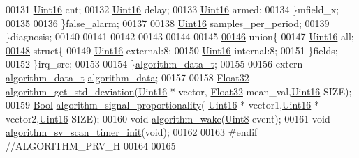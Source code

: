 \begin{DoxyCode}
00131                 \hyperlink{a00072_a59a9f6be4562c327cbfb4f7e8e18f08b}{Uint16}                 cnt;
00132                 \hyperlink{a00072_a59a9f6be4562c327cbfb4f7e8e18f08b}{Uint16}                 delay;
00133                 \hyperlink{a00072_a59a9f6be4562c327cbfb4f7e8e18f08b}{Uint16}                 armed;
00134             \}mfield\_x;
00135 
00136     \}false\_alarm;
00137 
00138       \hyperlink{a00072_a59a9f6be4562c327cbfb4f7e8e18f08b}{Uint16}  samples\_per\_period;
00139     \}diagnosis;
00140    
00141 
00142 
00143 
00144     
00145 
\hypertarget{a00016_source_l00146}{}\hyperlink{a00016}{00146}     \textcolor{keyword}{union}\{
00147         \hyperlink{a00072_a59a9f6be4562c327cbfb4f7e8e18f08b}{Uint16} all;
\hypertarget{a00016_source_l00148}{}\hyperlink{a00016}{00148}         \textcolor{keyword}{struct}\{
00149             \hyperlink{a00072_a59a9f6be4562c327cbfb4f7e8e18f08b}{Uint16} external:8;
00150             \hyperlink{a00072_a59a9f6be4562c327cbfb4f7e8e18f08b}{Uint16} \textcolor{keyword}{internal}:8;
00151         \}fields;
00152     \}irq\_src;
00153    
00154 \}\hyperlink{a00016_d1/d84/a00097}{algorithm\_data\_t};
00155 
00156 \textcolor{keyword}{extern} \hyperlink{a00016_d1/d84/a00097}{algorithm\_data\_t} \hyperlink{a00016_a183caa40cd01e79ee309cc9c4a225197}{algorithm\_data};
00157 
00158 \hyperlink{a00072_a87d38f886e617ced2698fc55afa07637}{Float32}     \hyperlink{a00016_a97eb6437dda088f144d791e49cd3dc2a}{algorithm\_get\_std\_deviation}(\hyperlink{a00072_a59a9f6be4562c327cbfb4f7e8e18f08b}{Uint16} * vector,
      \hyperlink{a00072_a87d38f886e617ced2698fc55afa07637}{Float32} mean\_val,\hyperlink{a00072_a59a9f6be4562c327cbfb4f7e8e18f08b}{Uint16} SIZE);
00159 \hyperlink{a00072_a253b248072cfc8bd812c69acd0046eed}{Bool}        \hyperlink{a00016_a2925c58a9c3f5d3c957eaca9a95a6c3a}{algorithm\_signal\_proportionality}(
      \hyperlink{a00072_a59a9f6be4562c327cbfb4f7e8e18f08b}{Uint16} * vector1,\hyperlink{a00072_a59a9f6be4562c327cbfb4f7e8e18f08b}{Uint16} * vector2,\hyperlink{a00072_a59a9f6be4562c327cbfb4f7e8e18f08b}{Uint16} SIZE);
00160 \textcolor{keywordtype}{void}        \hyperlink{a00016_a42ed16c7ef20e0c0031fe7ba7ae377b3}{algorithm\_wake}(\hyperlink{a00072_af84840501dec18061d18a68c162a8fa2}{Uint8} event);
00161 \textcolor{keywordtype}{void}        \hyperlink{a00016_ab898d2d804c49cb0978d26f6af64e0e4}{algorithm\_sv\_scan\_timer\_init}(\textcolor{keywordtype}{void});
00162 
00163 \textcolor{preprocessor}{#endif //ALGORITHM\_PRV\_H}
00164 
00165 
\end{DoxyCode}
